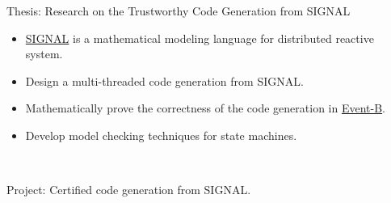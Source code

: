 \documentclass[a4paper,10pt]{memoir} %
\begin{document}




Thesis: Research on the Trustworthy Code Generation from SIGNAL

\begin{itemize}
	\item \href{http://polychrony.inria.fr/}{SIGNAL} is a mathematical modeling language for distributed reactive system.
	\item Design a multi-threaded code generation from SIGNAL.
	\item Mathematically prove  the correctness of the code generation in \href{http://www.event-b.org/}{Event-B}.
	\item Develop model checking techniques for state machines.
\end{itemize}
~\\

Project: Certified code generation from SIGNAL.
~\\




\Sep %



\end{document}
